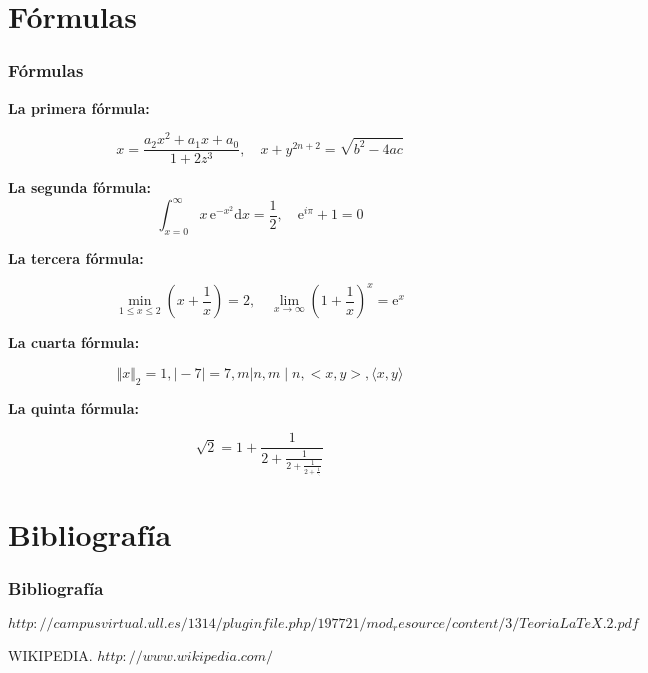 \documentclass{beamer}
\begin{document}
\section{Fórmulas}

\begin{frame}

\frametitle{Fórmulas}

\textbf{La primera fórmula:}

\[x=\frac{a_2 x^2 + a_1 x + a_0}{1+2z^3},\quad x+y^{2n+2}=\sqrt{b^2-4ac}
\]

\pause

\textbf{La segunda fórmula:}
\[\int_{x=0}^{\infty} x\,\text{e}^{-x^2}\text{d}x=\frac{1}{2},\quad\text{e}^{i\pi}+1=0 \]

\pause

\textbf{La tercera fórmula:}

\[\min_{1\le x\le 2}\left(x+\frac{1}{x}\right)=2,\quad \lim_{x\to\infty}\left(1+\frac{1}{x}\right)^x = \text{e}^x \]

\pause

\textbf{La cuarta fórmula:}

\[\Vert x \Vert_2=1, \vert -7 \vert = 7,m|n, m\mid n, <x,y>, \langle x, y\rangle\]

\pause
\end{frame}
\begin{frame}
\textbf{La quinta fórmula:}

\[ \sqrt 2 = 1+\frac{1}{2+\frac{1}{2+\frac{1}{2+\frac{1}{\ddots}}}} \]

\pause

\end{frame}


\section{Bibliografía}
\begin{frame}
  \frametitle{Bibliografía}

  \begin{thebibliography}{10}

    \beamertemplatebookbibitems
    
    {\small $http://campusvirtual.ull.es/1314/pluginfile.php/197721/mod_resource/content/3/TeoriaLaTeX.2.pdf$}

    \beamertemplatebookbibitems
    WIKIPEDIA. {\small $http://www.wikipedia.com/$}

  \end{thebibliography}
\end{frame}

\end{document}
